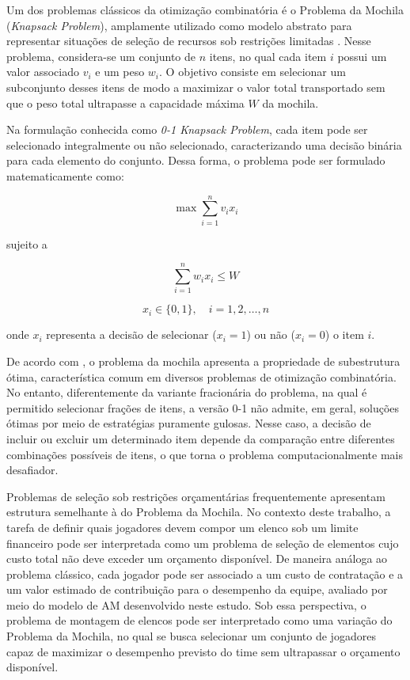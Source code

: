 Um dos problemas clássicos da otimização combinatória é o Problema da Mochila (\textit{Knapsack Problem}), amplamente utilizado como modelo
abstrato para representar situações de seleção de recursos sob restrições limitadas \cite{Cormen2009}. Nesse problema, considera-se um conjunto
de $n$ itens, no qual cada item $i$ possui um valor associado $v_i$ e um peso $w_i$. O objetivo consiste em selecionar um subconjunto desses itens
de modo a maximizar o valor total transportado sem que o peso total ultrapasse a capacidade máxima $W$ da mochila.

Na formulação conhecida como \textit{0-1 Knapsack Problem}, cada item pode ser selecionado integralmente ou não selecionado, caracterizando
uma decisão binária para cada elemento do conjunto. Dessa forma, o problema pode ser formulado matematicamente como:

\begin{equation}
\max \sum_{i=1}^{n} v_i x_i
\end{equation}

sujeito a

\begin{equation}
\sum_{i=1}^{n} w_i x_i \leq W
\end{equation}

\begin{equation}
x_i \in \{0,1\}, \quad i = 1,2,\dots,n
\end{equation}

onde $x_i$ representa a decisão de selecionar ($x_i = 1$) ou não ($x_i = 0$) o item $i$.

De acordo com \cite{Cormen2009}, o problema da mochila apresenta a propriedade de subestrutura ótima, característica comum em diversos problemas
de otimização combinatória. No entanto, diferentemente da variante fracionária do problema, na qual é permitido selecionar frações de itens,
a versão 0-1 não admite, em geral, soluções ótimas por meio de estratégias puramente gulosas. Nesse caso, a decisão de incluir ou excluir um
determinado item depende da comparação entre diferentes combinações possíveis de itens, o que torna o problema computacionalmente mais desafiador.

Problemas de seleção sob restrições orçamentárias frequentemente apresentam estrutura semelhante à do Problema da Mochila. No contexto deste
trabalho, a tarefa de definir quais jogadores devem compor um elenco sob um limite financeiro pode ser interpretada como um problema de seleção
de elementos cujo custo total não deve exceder um orçamento disponível. De maneira análoga ao problema clássico, cada jogador pode ser associado
a um custo de contratação e a um valor estimado de contribuição para o desempenho da equipe, avaliado por meio do modelo de AM
desenvolvido neste estudo. Sob essa perspectiva, o problema de montagem de elencos pode ser interpretado como uma variação do Problema da Mochila, 
no qual se busca selecionar um conjunto de jogadores capaz de maximizar o desempenho previsto do time sem ultrapassar o orçamento disponível.

